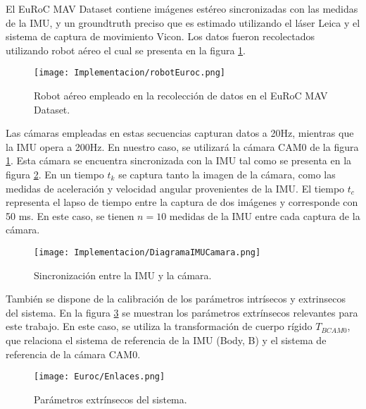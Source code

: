 {El EuRoC MAV Dataset contiene imágenes estéreo sincronizadas con las medidas de la IMU,  y un groundtruth preciso que es estimado utilizando el láser Leica y el sistema de captura de movimiento Vicon. Los datos fueron recolectados utilizando robot aéreo el cual se presenta en la figura \ref{fig:robotEuroc}. \\

\begin{figure}[H]
	\centering
	\texttt{[image: Implementacion/robotEuroc.png]}
	\caption[Robot aéreo empleado en la recolección de datos en el EuRoC MAV Dataset]{Robot aéreo empleado en la recolección de datos en el EuRoC MAV Dataset.}
	\label{fig:robotEuroc}
\end{figure}

Las cámaras empleadas en estas secuencias capturan datos a 20Hz, mientras que la IMU opera a 200Hz. En nuestro caso, se utilizará la cámara CAM0 de la figura \ref{fig:robotEuroc}. Esta cámara se encuentra sincronizada con la IMU tal como se presenta en la figura \ref{fig:sincronizacionEuroc}. En un tiempo $t_k$ se captura tanto la imagen de la cámara, como las medidas de aceleración y velocidad angular provenientes de la IMU. El tiempo $t_c$ representa el lapso de tiempo entre la captura de dos imágenes y corresponde con 50 ms. En este caso, se tienen $n = 10$ medidas de la IMU entre cada captura de la cámara. \\

\begin{figure}[H]
	\centering
	\texttt{[image: Implementacion/DiagramaIMUCamara.png]}
	\caption[Sincronización entre la IMU y la cámara]{Sincronización entre la IMU y la cámara.}
	\label{fig:sincronizacionEuroc}
\end{figure}

También se dispone de la calibración de los parámetros intrísecos y extrinsecos del sistema. En la figura \ref{fig:extrinsecosEuroc} se muestran los parámetros extrínsecos relevantes para este trabajo. En este caso, se utiliza la transformación de cuerpo rígido $T_{BCAM0}$, que relaciona el sistema de referencia de la IMU (Body, B) y el sistema de referencia de la cámara CAM0. 



\begin{figure}[H]
	\centering
	\texttt{[image: Euroc/Enlaces.png]}
	\caption[Parámetros extrínsecos del sistema]{Parámetros extrínsecos del sistema.}
	\label{fig:extrinsecosEuroc}
\end{figure}

}
